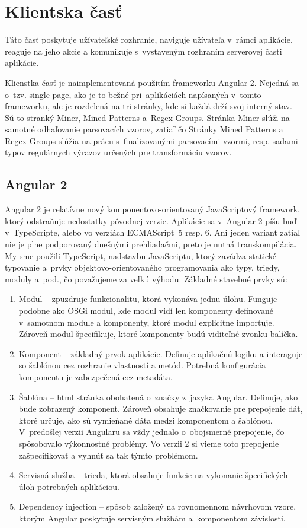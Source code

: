 \chapter{Klientska časť}
Táto časť poskytuje užívateľské rozhranie, naviguje užívateľa v~rámci aplikácie, reaguje na jeho akcie a komunikuje s~vystaveným rozhraním serverovej časti aplikácie.
\par Klienstka časť je naimplementovaná použitím frameworku Angular 2. Nejedná sa o~tzv. single page, ako je to bežné pri~aplikáciách napísaných v~tomto frameworku, ale je rozdelená na tri stránky, kde si každá drží svoj interný stav. Sú to stranký Miner, Mined Patterns a~Regex Groups. Stránka Miner slúži na samotné odhaľovanie parsovacích vzorov, zatiaľ čo Stránky Mined Patterns a Regex Groups slúžia na prácu s~finalizovanými parsovacími vzormi, resp. sadami typov regulárnych výrazov určených pre transformáciu vzorov.


\section{Angular 2}
Angular 2 je relatívne nový komponentovo-orientovaný JavaScriptový framework, ktorý odstraňuje nedostatky pôvodnej verzie. Aplikácie sa v~Angular 2 píšu buď v~TypeScripte, alebo vo verziách \mbox{ECMAScript}~5 resp. 6. Ani jeden variant zatiaľ nie je plne podporovaný dnešnými prehliadačmi, preto je nutná transkompilácia. My sme použili TypeScript, nadstavbu JavaScriptu, ktorý zavádza statické typovanie a~prvky objektovo-orientovaného programovania ako typy, triedy, moduly a~pod., čo považujeme za veľkú výhodu. Základné stavebné prvky sú:

\begin{enumerate}
 \item Modul -- zpuzdruje funkcionalitu, ktorá vykonáva jednu úlohu. Funguje podobne ako OSGi modul, kde modul vidí len komponenty definované v~samotnom module a komponenty, ktoré modul explicitne importuje. Zároveň modul špecifikuje, ktoré komponenty budú viditeľné zvonku balíčka.
 \item Komponent -- základný prvok aplikácie. Definuje aplikačnú logiku a interaguje so šablónou cez rozhranie vlastností a metód. Potrebná konfigurácia komponentu je zabezpečená cez metadáta.
 \item Šablóna -- html stránka obohatená o~značky z~jazyka Angular. Definuje, ako bude zobrazený komponent. Zároveň obsahuje značkovanie pre prepojenie dát, ktoré určuje, ako sú vymieňané dáta medzi komponentom a šablónou. V~predošlej verzii Angularu sa vždy jednalo o~obojsmerné prepojenie, čo spôsobovalo výkonnostné problémy. Vo verzii 2 si vieme toto prepojenie zašpecifikovať a vyhnúť sa tak týmto problémom.
 \item Servisná služba -- trieda, ktorá obsahuje funkcie na vykonanie špecifických úloh potrebných aplikáciou.
 \item Dependency injection -- spôsob založený na rovnomennom návr\-hovom vzore, ktorým Angular poskytuje servisným službám a~komponentom závislosti.
\end{enumerate}

